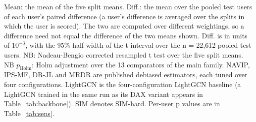 \begin{table}[tbp]
\par\smallskip
\begin{minipage}{\linewidth}\raggedright\footnotesize Mean: the mean of the five split means. Diff.: the mean over the pooled test users of each user's paired difference (a user's difference is averaged over the splits in which the user is scored). The two are computed over different weightings, so a difference need not equal the difference of the two means shown. Diff. is in units of $10^{-3}$, with the 95\% half-width of the t interval over the n = 22,612 pooled test users. NB: Nadeau-Bengio corrected resampled t test over the five split means. NB $p_{\mathrm{Holm}}$: Holm adjustment over the 13 comparators of the main family. NAVIP, IPS-MF, DR-JL and MRDR are published debiased estimators, each tuned over four configurations. LightGCN is the four-configuration LightGCN baseline (a LightGCN trained in the same run as its DAX variant appears in Table~\ref{tab:backbone}). SIM denotes SIM-hard. Per-user p values are in Table~\ref{tab:sens}.\end{minipage}
\end{table}
